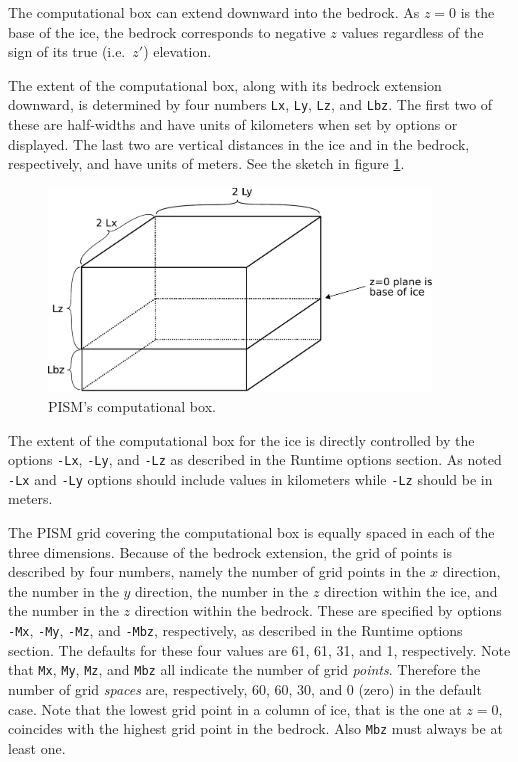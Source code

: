\documentclass[11pt,final]{amsart}
\renewcommand{\t}[1]{\texttt{#1}}
\begin{document}
The computational box can extend downward into the bedrock.  As $z=0$ is the base of the ice, the bedrock corresponds to negative $z$ values regardless of the sign of its true (i.e.~$z'$) elevation.

The extent of the computational box, along with its bedrock extension downward, is determined by four numbers \t{Lx}, \t{Ly}, \t{Lz}, and \t{Lbz}.  The first two of these are half-widths and have units of kilometers when set by options or displayed.  The last two are vertical distances in the ice and in the bedrock, respectively, and have units of meters.  See the sketch in figure \ref{fig:rectilinearbox}.

\begin{figure}[ht]
\includegraphics[width=4.0in,keepaspectratio=true]{figs/rectilinearbox}
\caption{PISM's computational box.}
\label{fig:rectilinearbox}
\end{figure}

The extent of the computational box for the ice is directly controlled by the options \t{-Lx}, \t{-Ly}, and \t{-Lz} as described in the Runtime options section.  As noted \t{-Lx} and \t{-Ly} options should include values in kilometers while \t{-Lz} should be in meters.

The PISM grid covering the computational box is equally spaced in each of the three dimensions.  Because of the bedrock extension, the grid of points is described by four numbers, namely the number of grid points in the $x$ direction, the number in the $y$ direction, the number in the $z$ direction within the ice, and the number in the $z$ direction within the bedrock.  These are specified by options \verb|-Mx|, \verb|-My|, \verb|-Mz|, and \verb|-Mbz|, respectively, as described in the Runtime options section.  The defaults for these four values are 61, 61, 31, and 1, respectively.  Note that \verb|Mx|, \verb|My|, \verb|Mz|, and \verb|Mbz| all indicate the number of grid \emph{points}.  Therefore the number of grid \emph{spaces} are, respectively, 60, 60, 30, and 0 (zero) in the default case.  Note that the lowest grid point in a column of ice, that is the one at $z=0$, coincides with the highest grid point in the bedrock.  Also \verb|Mbz| must always be at least one.
\end{document}
